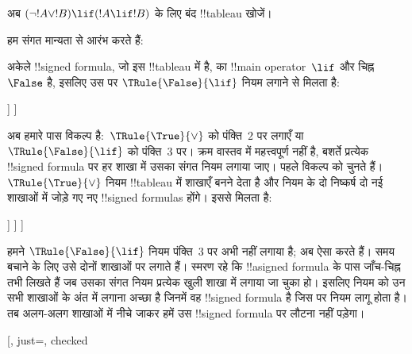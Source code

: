 \documentclass[../../../include/open-logic-section]{subfiles}
\begin{document}
\begin{ex}
अब $(\lnot !A \lor !B) \lif (!A
\lif !B)$ के लिए बंद !!{tableau} खोजें।

हम संगत मान्यता से आरंभ करते हैं:
\begin{oltableau}
  [\sFmla{\False}{(\lnot \formula{A} \lor \formula{B}) \lif
      (\formula{A} \lif \formula{B})}, just=\TAss]
\end{oltableau}
अकेले !!{signed formula}, जो इस !!{tableau} में है, का
!!{main operator}~$\lif$ और चिह्न~$\False$ है, इसलिए उस पर
$\TRule{\False}{\lif}$ नियम लगाने से मिलता है:
\begin{oltableau}
  [\sFmla{\False}{(\lnot \formula{A} \lor \formula{B})
      \lif (\formula{A} \lif \formula{B})}, just=\TAss, checked
    [\sFmla{\True}{\lnot \formula{A} \lor \formula{B}},
      just={\TRule{\False}{\lif}[1]}
      [\sFmla{\False}{(\formula{A} \lif \formula{B})},
        just={\TRule{\False}{\lif}[1]}
      ]
    ]
  ]
\end{oltableau}
अब हमारे पास विकल्प है:~$\TRule{\True}{\lor}$ को पंक्ति~$2$ पर लगाएँ या
$\TRule{\False}{\lif}$ को पंक्ति~$3$ पर। क्रम वास्तव में महत्त्वपूर्ण नहीं
है, बशर्ते प्रत्येक !!{signed formula} पर हर शाखा में उसका संगत नियम लगाया
जाए। पहले विकल्प को चुनते हैं। $\TRule{\True}{\lor}$ नियम !!{tableau} में
शाखाएँ बनने देता है और नियम के दो निष्कर्ष दो नई शाखाओं में जोड़े गए नए
!!{signed formula}s होंगे। इससे मिलता है:
\begin{oltableau}
  [\sFmla{\False}{(\lnot \formula{A} \lor \formula{B}) \lif
      (\formula{A} \lif \formula{B})}, just=\TAss, checked
    [\sFmla{\True}{\lnot \formula{A} \lor \formula{B}},
      just={\TRule{\False}{\lif}[1]}, checked
      [\sFmla{\False}{(\formula{A} \lif \formula{B})},
        just={\TRule{\False}{\lif}[1]}
        [\sFmla{\True}{\lnot \formula{A}}, just={\TRule{\True}{\lor}[2]}]
        [\sFmla{\True}{\formula{B}}, just={\TRule{\True}{\lor}[2]}]
      ]
    ]
  ]
\end{oltableau}
हमने $\TRule{\False}{\lif}$ नियम पंक्ति~$3$ पर अभी नहीं लगाया है; अब ऐसा
करते हैं। समय बचाने के लिए उसे दोनों शाखाओं पर लगाते हैं। स्मरण रहे कि
!!a{signed formula} के पास जाँच-चिह्न तभी लिखते हैं जब उसका संगत नियम
प्रत्येक खुली शाखा में लगाया जा चुका हो। इसलिए नियम को उन सभी शाखाओं के अंत
में लगाना अच्छा है जिनमें वह !!{signed formula} है जिस पर नियम लागू होता
है। तब अलग-अलग शाखाओं में नीचे जाकर हमें उस !!{signed formula} पर लौटना
नहीं पड़ेगा।
\begin{oltableau}
  [, just=\TAss, checked

\end{oltableau}
\end{ex}
\end{document}
